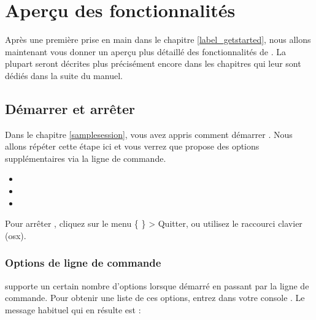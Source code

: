\chapter{Aperçu des fonctionnalités} \label{feature_glance}

Après une première prise en main dans le chapitre \ref{label_getstarted}, nous allons maintenant vous donner un aperçu plus détaillé des fonctionnalités de \qg. La plupart seront décrites plus précisément encore dans les chapitres qui leur sont dédiés dans la suite du manuel.

\section{Démarrer et arrêter \qg} \label{label_starting}

Dans le chapitre \ref{samplesession}, vous avez appris comment démarrer \qg. Nous allons répéter cette étape ici et vous verrez que \qg propose des options supplémentaires via la ligne de commande.

\begin{itemize}[label=--]
\item {} 
\item {}
\item {}
\end{itemize} 

Pour arrêter \qg, cliquez sur le menu \{\nix{}   \} > Quitter, ou utilisez le raccourci clavier  (osx{}).

\subsection{Options de ligne de commande} 
\label{label_commandline}

\nix \qg supporte un certain nombre d'options lorsque démarré en passant par la ligne de commande. Pour obtenir une liste de ces options, entrez dans votre console . Le message habituel qui en résulte est :

